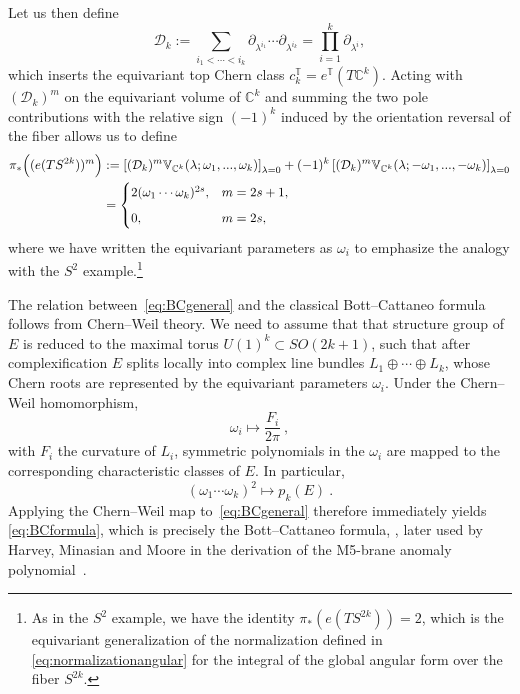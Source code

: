 \documentclass[11pt,a4paper]{article}
\theoremstyle{definition}
\theoremstyle{identity}
\theoremstyle{remark}
\newcommand{\be}{\begin{equation}}
\newcommand{\ee}{\end{equation}}
\newcommand{\bea}{\begin{eqnarray}}
\newcommand{\eea}{\end{eqnarray}}
\newcommand{\BV}{\mathbb{V}}
\newcommand{\BT}{\mathbb{T}}
\newcommand{\BC}{\mathbb{C}}
\begin{document}
Let us then define
\be
\mathcal D_k
:=
\sum_{i_1<\cdots<i_k}
\partial_{\lambda^{i_1}}\cdots
\partial_{\lambda^{i_k}}
=
\prod_{i=1}^{k}\partial_{\lambda^i},
\ee
which inserts the equivariant top Chern class
$c_k^{\BT}=e^{\BT}(T\BC^k)$.
Acting with $(\mathcal D_k)^m$ on the equivariant volume of $\BC^k$
and summing the two pole contributions with the relative sign
$(-1)^k$ induced by the orientation reversal of the fiber allows us to define
\bea
\label{eq:SviaC}
\pi_*
\Big((e(TS^{2k}))^m\Big)
& :=
\left[
\mathcal (\mathcal{D}_k)^m
\BV_{\BC^k}(\lambda;\omega_1,...,\omega_k)
\right]_{\lambda=0}
+
(-1)^k
\left[
\mathcal (\mathcal{D}_k)^m
\BV_{\BC^k}(\lambda;-\omega_1,...,-\omega_k)
\right]_{\lambda=0}
\notag\\
&=
\begin{cases}
2(\omega_1\cdots\omega_k)^{2s},
&
m=2s+1,
\\[2mm]
0,
&
m=2s,
\end{cases}
\label{eq:BCgeneral}
\eea
where we have written the equivariant parameters as $\omega_i$ to emphasize the analogy with the
$S^2$ example.\footnote{As in the $S^2$ example, we have the identity $\pi_*(e(TS^{2k}))=2$, which is the equivariant generalization of the normalization defined in \eqref{eq:normalizationangular} for the integral of the global angular form over the fiber $S^{2k}$.} %

The relation between~\eqref{eq:BCgeneral} and the classical Bott--Cattaneo formula follows from
Chern--Weil theory. We need to assume that that
structure group of $E$ is reduced to the maximal torus
$U(1)^k\subset SO(2k+1)$, such that after complexification
$E$ splits locally into complex line bundles
$L_1\oplus\cdots\oplus L_k$,
whose Chern roots are represented by the equivariant parameters
$\omega_i$.
Under the Chern--Weil homomorphism,
\be
\label{eq:CW1}
\omega_i
\longmapsto
\frac{F_i}{2\pi}\ ,
\ee
with $F_i$ the curvature of $L_i$, symmetric polynomials in the $\omega_i$ are mapped to the
corresponding characteristic classes of $E$. In particular,
\be
\label{eq:CW2}
(\omega_1\cdots\omega_k)^2
\longmapsto
p_k(E)\ .
\ee
Applying the Chern--Weil map to~\eqref{eq:BCgeneral} therefore immediately yields \eqref{eq:BCformula},
which is precisely the Bott--Cattaneo formula, \cite{1997dg.ga}, later used by Harvey, Minasian and Moore in the derivation of the M5-brane
anomaly polynomial~\cite{Harvey:1998bx}.
\end{document}
